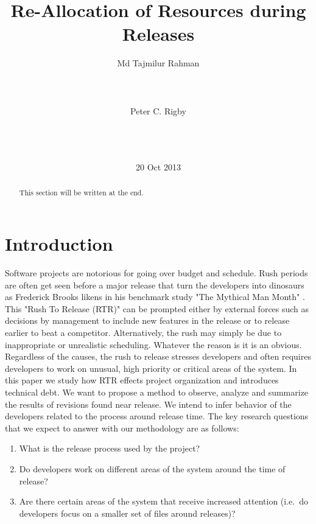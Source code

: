 \documentclass{acm_proc_article-sp}
\begin{document}
\title{Re-Allocation of Resources during Releases }
\author{
\alignauthor
Md Tajmilur Rahman\\
       \\
       \\
       \\
\alignauthor
Peter C. Rigby\\
       \\
       \\
       \\
}
\date{20 Oct 2013}
\maketitle
\begin{abstract}
This section will be written at the end.
\end{abstract}
\section{Introduction}
Software projects are notorious for going over budget and schedule. Rush periods are often get seen before a major release that turn the developers into dinosaurs as Frederick Brooks likens in his benchmark study "The Mythical Man Month" \cite{brooks_mythical}. This "Rush To Release (RTR)" can be prompted either by external forces such as decisions by management to include new features in the release or to release earlier to beat a competitor. Alternatively, the rush may simply be due to inappropriate or unrealistic scheduling. Whatever the reason is it is an obvious. Regardless of the causes, the rush to release stresses developers and often requires developers to work on unusual, high priority or critical areas of the system. In this paper we study how RTR effects project organization and introduces technical debt. We want to propose a method to observe, analyze and summarize the results of revisions found near release. We intend to infer behavior of the developers related to the process around release time. The key research questions that we expect to answer with our methodology are as follows:
\begin{enumerate}

\item What is the release process used by the project?
\item Do developers work on different areas of the system around the time of release?
\item Are there certain areas of the system that receive increased attention (i.e.\ do developers focus on a smaller set of files around releases)?
\end{enumerate}
\end{document}
